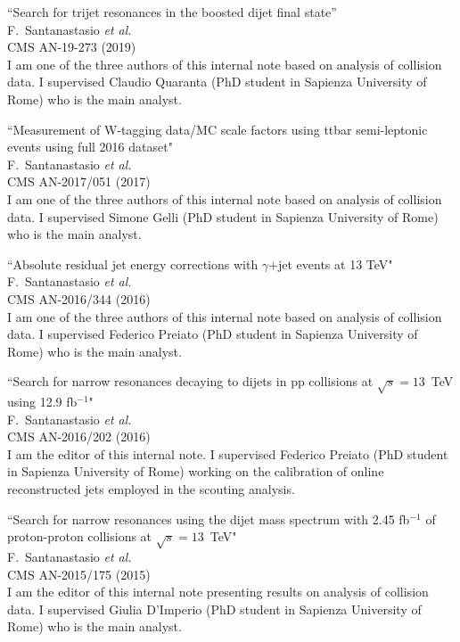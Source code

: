 \documentclass[10pt, a4paper]{article}
\begin{document}
\begin{thebibliography}{599}
``Search for trijet resonances in the boosted dijet final state''
  \\{}F.~Santanastasio {\it et al.}
  \\{}CMS AN-19-273 (2019)
  \\ I am one of the three authors of this internal note based on
  analysis of collision data. I supervised
  Claudio Quaranta (PhD student in Sapienza University of Rome) who is
  the main analyst.

``Measurement of W-tagging data/MC scale factors using ttbar semi-leptonic events using full 2016 dataset"
  \\{}F.~Santanastasio {\it et al.}
  \\{}CMS AN-2017/051 (2017)
  \\ I am one of the three authors of this internal note based on
  analysis of collision data. I supervised
  Simone Gelli (PhD student in Sapienza University of Rome) who is
  the main analyst.

``Absolute residual jet energy corrections with $\gamma$+jet events at 13 TeV"
  \\{}F.~Santanastasio {\it et al.}
  \\{}CMS AN-2016/344 (2016)
  \\ I am one of the three authors of this internal note based on
  analysis of collision data. I supervised
  Federico Preiato (PhD student in Sapienza University of Rome) who is
  the main analyst.

``Search for narrow resonances decaying to dijets in pp collisions at $\sqrt{s}=13$~TeV using 12.9 fb$^{-1}$"
  \\{}F.~Santanastasio {\it et al.}
  \\{}CMS AN-2016/202 (2016)
  \\ I am the editor of this internal note. I supervised Federico Preiato (PhD student in Sapienza University of Rome)
  working on the calibration of online reconstructed jets employed in the scouting analysis.

``Search for narrow resonances using the dijet mass spectrum with 2.45 fb$^{-1}$ of proton-proton collisions at $\sqrt{s}=13$~TeV"
  \\{}F.~Santanastasio {\it et al.}
  \\{}CMS AN-2015/175 (2015)
  \\ I am the editor of this internal note presenting results on
  analysis of collision data. I supervised Giulia D'Imperio (PhD
  student in Sapienza University of Rome) who is the main analyst.


\end{thebibliography}
\end{document}
